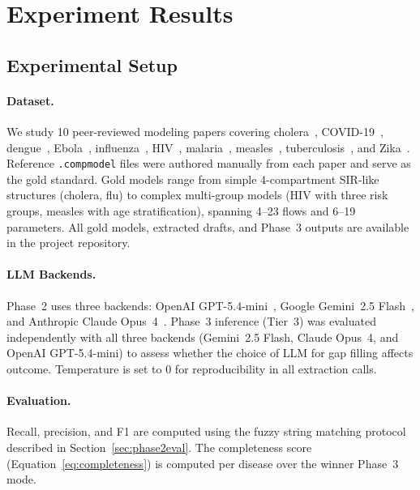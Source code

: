 \section{Experiment Results}
\label{sec:results}

\subsection{Experimental Setup}

\paragraph{Dataset.}
We study 10 peer-reviewed modeling papers covering cholera~\cite{Fung2014Cholera},
COVID-19~\cite{TuiteE497}, dengue~\cite{dengue}, Ebola~\cite{Abbas2024Ebola},
influenza~\cite{Corbella2017MonitoringAP}, HIV~\cite{Espitia2022},
malaria~\cite{Akowe2025Malaria}, measles~\cite{Pokharel2024Measles},
tuberculosis~\cite{tuberculosis}, and Zika~\cite{Lee2016Zika}.
Reference \texttt{.compmodel} files were authored manually from each paper and serve
as the gold standard. Gold models range from simple 4-compartment SIR-like structures
(cholera, flu) to complex multi-group models (HIV with three risk groups, measles with
age stratification), spanning 4--23 flows and 6--19 parameters.
All gold models, extracted drafts, and Phase~3 outputs are available in the project
repository.

\paragraph{LLM Backends.}
Phase~2 uses three backends: OpenAI GPT-5.4-mini~\cite{achiam2023gpt4}, Google
Gemini~2.5 Flash~\cite{team2024gemini}, and Anthropic Claude Opus~4~\cite{anthropic2024claude}.
Phase~3 inference (Tier~3) was evaluated independently with all three backends
(Gemini~2.5 Flash, Claude Opus~4, and OpenAI GPT-5.4-mini) to assess whether the
choice of LLM for gap filling affects outcome.
Temperature is set to 0 for reproducibility in all extraction calls.

\paragraph{Evaluation.}
Recall, precision, and F1 are computed using the fuzzy string matching protocol
described in Section~\ref{sec:phase2eval}. The completeness score
(Equation~\ref{eq:completeness}) is computed per disease over the winner Phase~3 mode.

